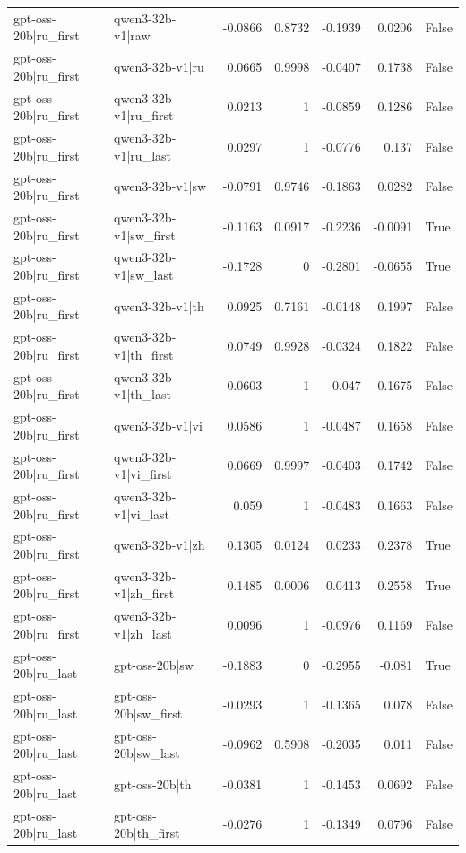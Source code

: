 \begin{table}
\begin{tabular}{l l r r r r l}
gpt-oss-20b|ru_first & qwen3-32b-v1|raw & -0.0866 & 0.8732 & -0.1939 & 0.0206 & False \\
gpt-oss-20b|ru_first & qwen3-32b-v1|ru & 0.0665 & 0.9998 & -0.0407 & 0.1738 & False \\
gpt-oss-20b|ru_first & qwen3-32b-v1|ru_first & 0.0213 & 1 & -0.0859 & 0.1286 & False \\
gpt-oss-20b|ru_first & qwen3-32b-v1|ru_last & 0.0297 & 1 & -0.0776 & 0.137 & False \\
gpt-oss-20b|ru_first & qwen3-32b-v1|sw & -0.0791 & 0.9746 & -0.1863 & 0.0282 & False \\
gpt-oss-20b|ru_first & qwen3-32b-v1|sw_first & -0.1163 & 0.0917 & -0.2236 & -0.0091 & True \\
gpt-oss-20b|ru_first & qwen3-32b-v1|sw_last & -0.1728 & 0 & -0.2801 & -0.0655 & True \\
gpt-oss-20b|ru_first & qwen3-32b-v1|th & 0.0925 & 0.7161 & -0.0148 & 0.1997 & False \\
gpt-oss-20b|ru_first & qwen3-32b-v1|th_first & 0.0749 & 0.9928 & -0.0324 & 0.1822 & False \\
gpt-oss-20b|ru_first & qwen3-32b-v1|th_last & 0.0603 & 1 & -0.047 & 0.1675 & False \\
gpt-oss-20b|ru_first & qwen3-32b-v1|vi & 0.0586 & 1 & -0.0487 & 0.1658 & False \\
gpt-oss-20b|ru_first & qwen3-32b-v1|vi_first & 0.0669 & 0.9997 & -0.0403 & 0.1742 & False \\
gpt-oss-20b|ru_first & qwen3-32b-v1|vi_last & 0.059 & 1 & -0.0483 & 0.1663 & False \\
gpt-oss-20b|ru_first & qwen3-32b-v1|zh & 0.1305 & 0.0124 & 0.0233 & 0.2378 & True \\
gpt-oss-20b|ru_first & qwen3-32b-v1|zh_first & 0.1485 & 0.0006 & 0.0413 & 0.2558 & True \\
gpt-oss-20b|ru_first & qwen3-32b-v1|zh_last & 0.0096 & 1 & -0.0976 & 0.1169 & False \\
gpt-oss-20b|ru_last & gpt-oss-20b|sw & -0.1883 & 0 & -0.2955 & -0.081 & True \\
gpt-oss-20b|ru_last & gpt-oss-20b|sw_first & -0.0293 & 1 & -0.1365 & 0.078 & False \\
gpt-oss-20b|ru_last & gpt-oss-20b|sw_last & -0.0962 & 0.5908 & -0.2035 & 0.011 & False \\
gpt-oss-20b|ru_last & gpt-oss-20b|th & -0.0381 & 1 & -0.1453 & 0.0692 & False \\
gpt-oss-20b|ru_last & gpt-oss-20b|th_first & -0.0276 & 1 & -0.1349 & 0.0796 & False \\

\end{tabular}
\end{table}
